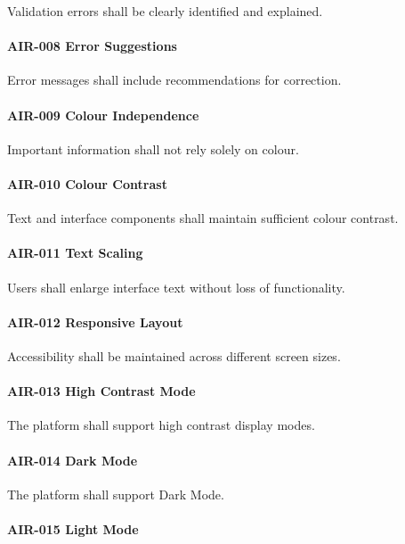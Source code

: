 Validation errors shall be clearly identified and explained.

\paragraph{AIR-008 Error Suggestions}

Error messages shall include recommendations for correction.

\paragraph{AIR-009 Colour Independence}

Important information shall not rely solely on colour.

\paragraph{AIR-010 Colour Contrast}

Text and interface components shall maintain sufficient colour contrast.

\paragraph{AIR-011 Text Scaling}

Users shall enlarge interface text without loss of functionality.

\paragraph{AIR-012 Responsive Layout}

Accessibility shall be maintained across different screen sizes.

\paragraph{AIR-013 High Contrast Mode}

The platform shall support high contrast display modes.

\paragraph{AIR-014 Dark Mode}

The platform shall support Dark Mode.

\paragraph{AIR-015 Light Mode}

